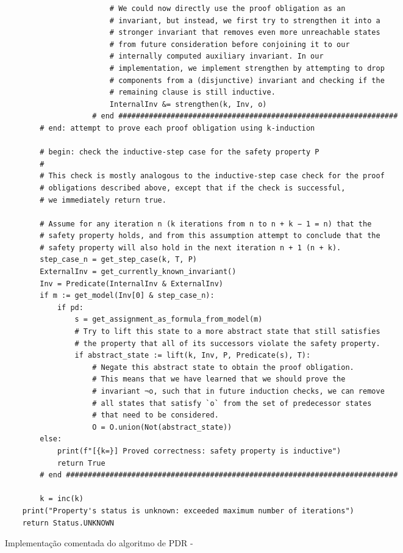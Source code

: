 \documentclass[11pt,a4paper]{report}%
\newenvironment{code}{\captionsetup{type=listing}}{}
\begin{document}
\begin{code}
\begin{verbatim}
                        # We could now directly use the proof obligation as an
                        # invariant, but instead, we first try to strengthen it into a
                        # stronger invariant that removes even more unreachable states
                        # from future consideration before conjoining it to our
                        # internally computed auxiliary invariant. In our
                        # implementation, we implement strengthen by attempting to drop
                        # components from a (disjunctive) invariant and checking if the
                        # remaining clause is still inductive.
                        InternalInv &= strengthen(k, Inv, o)
                    # end ################################################################
        # end: attempt to prove each proof obligation using k-induction

        # begin: check the inductive-step case for the safety property P
        #
        # This check is mostly analogous to the inductive-step case check for the proof
        # obligations described above, except that if the check is successful,
        # we immediately return true.

        # Assume for any iteration n (k iterations from n to n + k − 1 = n) that the
        # safety property holds, and from this assumption attempt to conclude that the
        # safety property will also hold in the next iteration n + 1 (n + k).
        step_case_n = get_step_case(k, T, P)
        ExternalInv = get_currently_known_invariant()
        Inv = Predicate(InternalInv & ExternalInv)
        if m := get_model(Inv[0] & step_case_n):
            if pd:
                s = get_assignment_as_formula_from_model(m)
                # Try to lift this state to a more abstract state that still satisfies
                # the property that all of its successors violate the safety property.
                if abstract_state := lift(k, Inv, P, Predicate(s), T):
                    # Negate this abstract state to obtain the proof obligation.
                    # This means that we have learned that we should prove the
                    # invariant ¬o, such that in future induction checks, we can remove
                    # all states that satisfy `o` from the set of predecessor states
                    # that need to be considered.
                    O = O.union(Not(abstract_state))
        else:
            print(f"[{k=}] Proved correctness: safety property is inductive")
            return True
        # end ############################################################################

        k = inc(k)
    print("Property's status is unknown: exceeded maximum number of iterations")
    return Status.UNKNOWN
\end{verbatim}
\caption{Implementação comentada do algoritmo de PDR -\cite{pdr_state_of_art}}
\label{code:pdr_commented}
\end{code}
\end{document}

